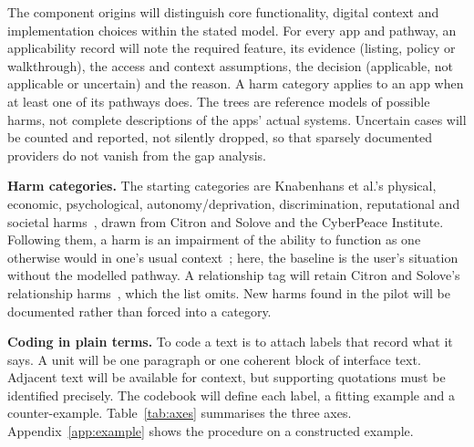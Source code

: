 \documentclass[sigconf,nonacm,natbib=false]{acmart}
\begin{document}
The component origins will distinguish core functionality, digital context
and implementation choices within the stated model. For every app and
pathway, an applicability record will note the required feature, its
evidence (listing, policy or walkthrough), the access and context
assumptions, the decision (applicable, not applicable or uncertain) and the
reason. A harm category applies to an app when at least one of its pathways
does. The trees are reference models of possible harms, not complete
descriptions of the apps' actual systems. Uncertain cases will be counted and
reported, not silently dropped, so that sparsely documented providers do not
vanish from the gap analysis.

\textbf{Harm categories.} The starting categories are Knabenhans et al.'s
physical, economic, psychological, autonomy/deprivation, discrimination,
reputational and societal harms~\parencite[App.~A]{knabenhans2026harms},
drawn from Citron and Solove and the CyberPeace Institute. Following them, a
harm is an impairment of the ability to function as one otherwise would in
one's usual context~\parencite[\S4.1]{knabenhans2026harms}; here, the baseline
is the user's situation without the modelled pathway. A relationship tag will
retain Citron and Solove's relationship harms~\parencite{citron2021harms},
which the list omits. New harms found in the pilot will be documented rather
than forced into a category.

\textbf{Coding in plain terms.} To code a text is to attach labels that
record what it says. A unit will be one paragraph or one coherent block of
interface text. Adjacent text will be available for context, but supporting quotations must
be identified precisely. The codebook will define each label, a fitting
example and a counter-example. Table~\ref{tab:axes} summarises the three axes.
Appendix~\ref{app:example} shows the procedure on a constructed example.
\end{document}
